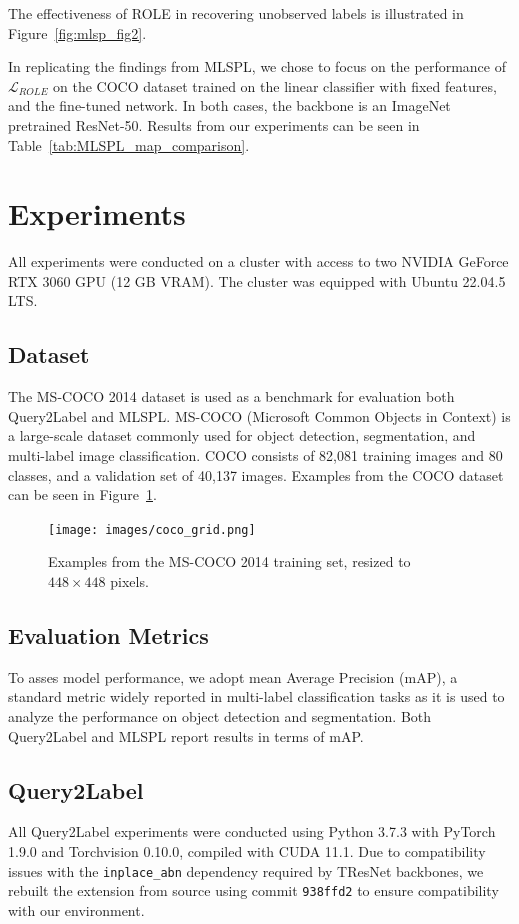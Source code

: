 \documentclass[lettersize,journal]{IEEEtran}
\begin{document}
The effectiveness of ROLE in recovering unobserved labels is illustrated in Figure~\ref{fig:mlsp_fig2}. 

In replicating the findings from MLSPL, we chose to focus on the performance of $\mathcal{L}_{ROLE}$ on the COCO dataset trained on the linear classifier with fixed features, and the fine-tuned network. In both cases, the backbone is an ImageNet pretrained ResNet-50. Results from our experiments can be seen in Table~\ref{tab:MLSPL_map_comparison}.


\section{Experiments}
All experiments were conducted on a cluster with access to two NVIDIA GeForce RTX 3060 GPU (12 GB VRAM). The cluster was equipped with Ubuntu 22.04.5 LTS.

\subsection{Dataset}
The MS-COCO 2014 \cite{coco14} dataset is used as a benchmark for evaluation both Query2Label and MLSPL. MS-COCO (Microsoft Common Objects in Context) is a large-scale dataset commonly used for object detection, segmentation, and multi-label image classification. COCO consists of 82,081 training images and 80 classes, and a validation set of 40,137 images. Examples from the COCO dataset can be seen in Figure~\ref{fig:coco-examples}.

\begin{figure}[t]
    \centering
    \texttt{[image: images/coco\_grid.png]}
    \caption{Examples from the MS-COCO 2014 training set, resized to $448 \times 448$ pixels.}
    \label{fig:coco-examples}
\end{figure}

\subsection{Evaluation Metrics}
To asses model performance, we adopt mean Average Precision (mAP), a standard metric widely reported in multi-label classification tasks as it is used to analyze the performance on object detection and segmentation. Both Query2Label and MLSPL report results in terms of mAP. 

\subsection{Query2Label}
All Query2Label experiments were conducted using Python 3.7.3 with PyTorch 1.9.0 and Torchvision 0.10.0, compiled with CUDA 11.1. Due to compatibility issues with the \texttt{inplace\_abn} dependency required by TResNet backbones, we rebuilt the extension from source using commit \texttt{938ffd2} to ensure compatibility with our environment.
\end{document}
